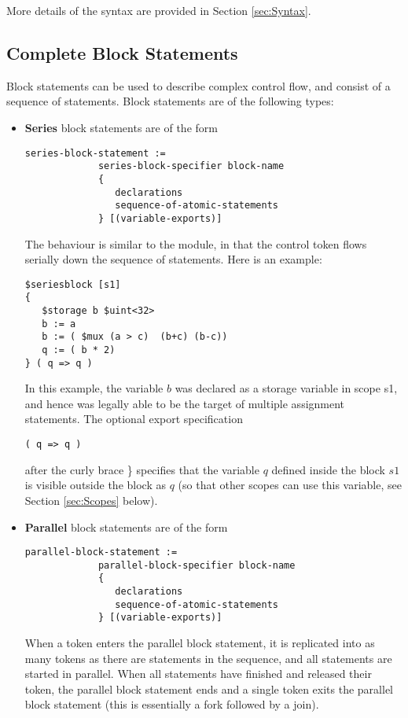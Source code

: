\documentclass{article}
\begin{document}
More details of the syntax are provided in 
Section \ref{sec:Syntax}.


\subsection{Complete Block Statements}

Block statements can be used to describe complex
control flow,  and consist of a sequence of statements.
Block statements are of
the following types:
\begin{itemize}
\item {\bf Series} block statements are of the form
\begin{verbatim}
series-block-statement :=
             series-block-specifier block-name
             { 
                declarations
                sequence-of-atomic-statements
             } [(variable-exports)]
\end{verbatim}
The behaviour is similar to the module, in that the control
token flows serially down the sequence of statements.
Here is an example:
\begin{verbatim}
$seriesblock [s1] 
{
   $storage b $uint<32>
   b := a
   b := ( $mux (a > c)  (b+c) (b-c))
   q := ( b * 2)
} ( q => q )
\end{verbatim}
In this example, the variable $b$ was declared as
a storage variable in scope s1, and hence was legally
able to be the target of multiple assignment statements.
The optional export specification
\begin{verbatim}
( q => q )
\end{verbatim}
after the curly brace \} specifies that the variable
$q$ defined inside the block $s1$ is visible outside
the block as $q$ (so that other scopes can use this
variable, see Section \ref{sec:Scopes} below).
\item {\bf Parallel} block statements are of the form
\begin{verbatim}
parallel-block-statement :=
             parallel-block-specifier block-name
             { 
                declarations
                sequence-of-atomic-statements
             } [(variable-exports)]
\end{verbatim}
When a token enters the parallel block statement, it
is replicated into as many tokens as there are statements in
the sequence, and all statements are started in parallel.
When all statements have finished and released their token,
the parallel block statement
ends and a single token exits the parallel block statement (this
is essentially a fork followed by a join).

\end{itemize}
\end{document}
